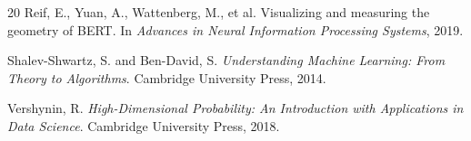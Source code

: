 \documentclass[12pt]{article}
\theoremstyle{definition}
\theoremstyle{remark}
\begin{document}
\begin{thebibliography}{20}
Reif, E., Yuan, A., Wattenberg, M., et al.
\newblock Visualizing and measuring the geometry of {BERT}.
\newblock In \emph{Advances in Neural Information Processing Systems}, 2019.

Shalev-Shwartz, S. and Ben-David, S.
\newblock \emph{Understanding Machine Learning: From Theory to Algorithms}.
\newblock Cambridge University Press, 2014.

Vershynin, R.
\newblock \emph{High-Dimensional Probability: An Introduction with Applications
  in Data Science}.
\newblock Cambridge University Press, 2018.

\end{thebibliography}
\end{document}
